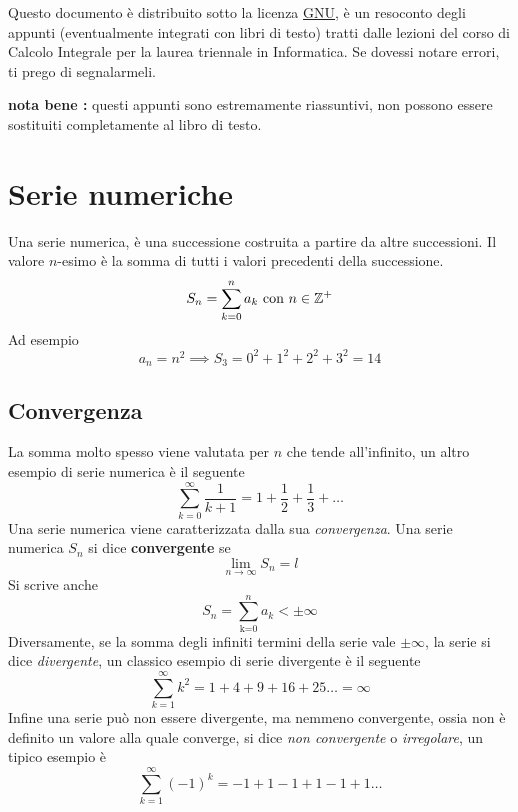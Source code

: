 \documentclass[10pt, letterpaper]{report}
\begin{document}
\newpage
\pagecolor{cartaRiciclata}%
Questo documento è distribuito sotto la licenza
\color{blue}\href{https://www.gnu.org/licenses/fdl-1.3.txt}{GNU}\color{black},
è un resoconto degli appunti (eventualmente integrati con libri di testo) tratti dalle lezioni del corso di Calcolo Integrale
\hphantom{a}per la laurea
triennale in Informatica. Se dovessi notare errori, ti prego di segnalarmeli.



\textbf{nota bene :} questi appunti sono estremamente riassuntivi, non possono essere sostituiti
completamente al libro di testo.
\newpage %
\normalsize
\tableofcontents
\newpage

\fancyhf{}
\fancyhead[L]{\nouppercase{\leftmark}}
\fancyfoot[C]{\thepage}






\chapter{Serie numeriche}
 Una serie numerica, è una successione costruita a partire da altre successioni. Il valore
$n$-esimo è la somma di tutti i valori precedenti della successione.
$$ S_n = \sum_{k=0}^n a_k\text{ con }n\in {\mathbb Z}^+$$
Ad esempio
$$ a_n=n^2\implies S_3 = 0^2+1^2+2^2+3^2=14$$
\section{Convergenza}
La somma molto spesso viene valutata per $n$ che tende all'infinito, un altro esempio di serie
numerica è il seguente
$$ \sum_{k=0}^\infty \dfrac{1}{k+1}=1+\frac{1}{2}+\frac{1}{3}+\dots$$
Una serie numerica viene caratterizzata dalla sua \textit{convergenza}.\acc
{}Una serie numerica $S_n$ si dice \textbf{convergente} se
$$ \lim_{n\rightarrow \infty} S_n = l$$
Si scrive anche
$$S_n =\displaystyle \sum_\text{k=0}^n a_k < \pm\infty$$
Diversamente, se la somma degli infiniti termini della serie vale $\pm\infty$,
la serie si dice \textit{divergente}, un classico esempio di serie divergente è il seguente
$$ \sum_{k=1}^\infty k^2=1+4+9+16+25\dots = \infty$$
Infine una serie può non essere divergente, ma nemmeno convergente, ossia non è
definito un valore alla quale converge, si dice \textit{non convergente} o
\textit{irregolare}, un tipico esempio è
$$ \sum_{k=1}^\infty (-1)^k=-1+1-1+1-1+1\dots $$
\end{document}
